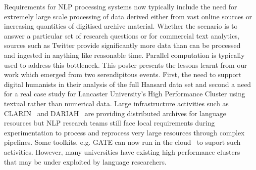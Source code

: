 Requirements for NLP processing systems now typically include the need for extremely large scale processing of data derived either from vast online sources or increasing quantities of digitised archive material. 
Whether the scenario is to answer a particular set of research questions or for commercial text analytics, sources such as Twitter provide significantly more data than can be processed and ingested in anything like reasonable time. Parallel computation is typically used to address this bottleneck. 
This poster presents the lessons learnt from our work which emerged from two serendipitous events. First, the need to support digital humanists in their analysis of the full Hansard data set and second a need for a real case study for Lancaster University's High Performance Cluster using textual rather than numerical data. Large infrastructure activities such as CLARIN~\cite{varadi2008clarin} and DARIAH~\cite{constantopoulos2008preparing} are providing distributed archives for language resources but NLP research teams still face local requirements during experimentation to process and reprocess very large resources through complex pipelines. Some toolkits, e.g. GATE can now run in the cloud~\cite{tablan2013gatecloud} to suport such activities. However, many universities have existing high performance clusters that may be under exploited by language researchers. 

